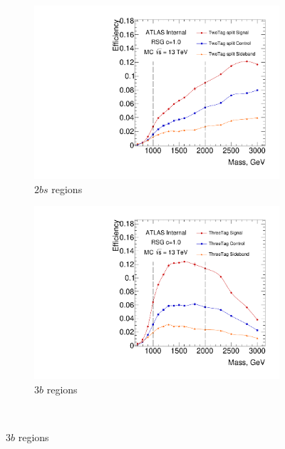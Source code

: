 \begin{figure}[htb!]
  \centering
  \captionsetup{justification=centering}
    \begin{subfigure}[b]{0.4\textwidth}
        \includegraphics[width=\textwidth,angle=-90]{figures/boosted/SigEff/region_2b_lst_Moriond_Efficiency_PreSel.pdf}
        \caption{$2bs$ regions}
        \label{fig:2bs-selection-region-efficiency}
    \end{subfigure}
    \quad \quad 
    \begin{subfigure}[b]{0.4\textwidth}
        \includegraphics[width=\textwidth,angle=-90]{figures/boosted/SigEff/region_3b_lst_Moriond_Efficiency_PreSel.pdf}
        \caption{$3b$ regions}
        \label{fig:3b-selection-region-efficiency}
    \end{subfigure} \\ 

\end{figure}
